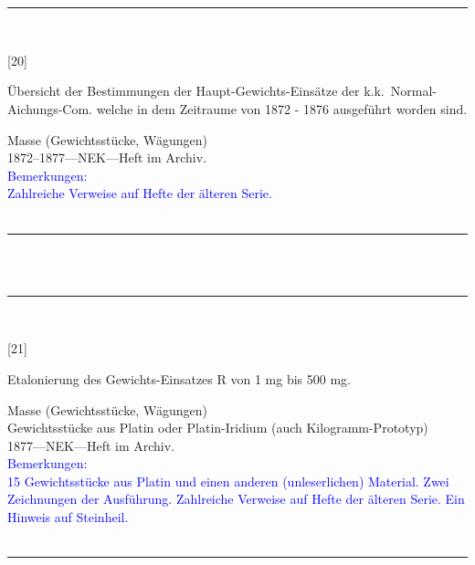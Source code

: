 \\
\vspace*{-2.5pt}\\
\parbox{\textwidth}{%
\rule{\textwidth}{1pt}\vspace*{-3mm}\\
\begin{minipage}[t]{0.15\textwidth}\vspace{0pt}
\Huge\rule[-4mm]{0cm}{1cm}[20]
\end{minipage}
\hfill
\begin{minipage}[t]{0.85\textwidth}\vspace{0pt}
\large Übersicht der Bestimmungen der Haupt-Gewichts-Einsätze der k.k.\ Normal-Aichungs-Com. welche in dem Zeitraume von 1872 - 1876 ausgeführt worden sind.\rule[-2mm]{0mm}{2mm}
\end{minipage}
{\footnotesize\flushright
Masse (Gewichtsstücke, Wägungen)\\
}
1872--1877\quad---\quad NEK\quad---\quad Heft im Archiv.\\
\textcolor{blue}{Bemerkungen:\\{}
Zahlreiche Verweise auf Hefte der älteren Serie.\\{}
}
\\[-15pt]
\rule{\textwidth}{1pt}
}
\\
\vspace*{-2.5pt}\\
\parbox{\textwidth}{%
\rule{\textwidth}{1pt}\vspace*{-3mm}\\
\begin{minipage}[t]{0.15\textwidth}\vspace{0pt}
\Huge\rule[-4mm]{0cm}{1cm}[21]
\end{minipage}
\hfill
\begin{minipage}[t]{0.85\textwidth}\vspace{0pt}
\large Etalonierung des Gewichts-Einsatzes {\glqq}R{\grqq} von 1 mg bis 500 mg.\rule[-2mm]{0mm}{2mm}
\end{minipage}
{\footnotesize\flushright
Masse (Gewichtsstücke, Wägungen)\\
Gewichtsstücke aus Platin oder Platin-Iridium (auch Kilogramm-Prototyp)\\
}
1877\quad---\quad NEK\quad---\quad Heft im Archiv.\\
\textcolor{blue}{Bemerkungen:\\{}
15 Gewichtsstücke aus Platin und einen anderen (unleserlichen) Material. Zwei Zeichnungen der Ausführung. Zahlreiche Verweise auf Hefte der älteren Serie. Ein Hinweis auf Steinheil.\\{}
}
\\[-15pt]
\rule{\textwidth}{1pt}
}
